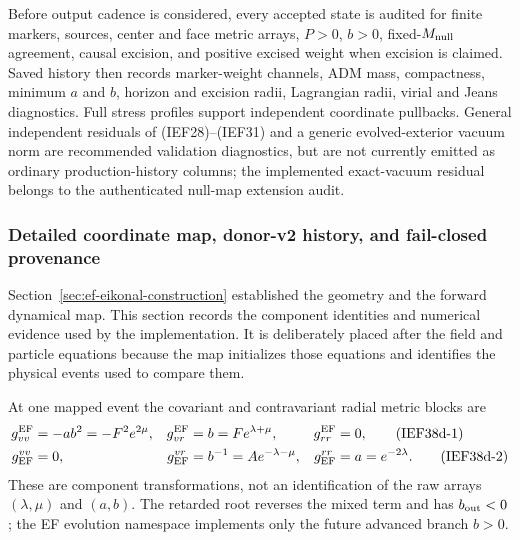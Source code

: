 Before output cadence is considered, every accepted state is audited for
finite markers, sources, center and face metric arrays, \(P>0\), \(b>0\),
fixed-\(M_{\rm null}\) agreement, causal excision, and positive excised weight
when excision is claimed.  Saved history then records marker-weight channels,
ADM mass, compactness, minimum \(a\) and \(b\), horizon and excision radii,
Lagrangian radii, virial and Jeans diagnostics.  Full stress profiles support
independent coordinate pullbacks.  General independent residuals of
(IEF28)--(IEF31) and a generic evolved-exterior vacuum norm are recommended
validation diagnostics, but are not currently emitted as ordinary
production-history columns; the implemented exact-vacuum residual belongs to
the authenticated null-map extension audit.
\subsubsection{Detailed coordinate map, donor-v2 history, and fail-closed provenance}
\label{sec:ef-detailed-map}

Section~\ref{sec:ef-eikonal-construction} established the geometry and the
forward dynamical map.  This section records the component identities and
numerical evidence used by the implementation.  It is deliberately placed
after the field and particle equations because the map initializes those
equations and identifies the physical events used to compare them.

At one mapped event the covariant and contravariant radial metric blocks are
\begin{align}
 g^{\rm EF}_{vv}&=-ab^2=-F^2e^{2\mu},&
 g^{\rm EF}_{vr}&=b=F e^{\lambda+\mu},&
 g^{\rm EF}_{rr}&=0,                                    \tag{IEF38d-1}\\
 g_{\rm EF}^{vv}&=0,&
 g_{\rm EF}^{vr}&=b^{-1}=A e^{-\lambda-\mu},&
 g_{\rm EF}^{rr}&=a=e^{-2\lambda}.                       \tag{IEF38d-2}
\end{align}
These are component transformations, not an identification of the raw arrays
\((\lambda,\mu)\) and \((a,b)\).  The retarded root reverses the mixed term
and has \(b_{\rm out}<0\); the EF evolution namespace implements only the
future advanced branch \(b>0\).

